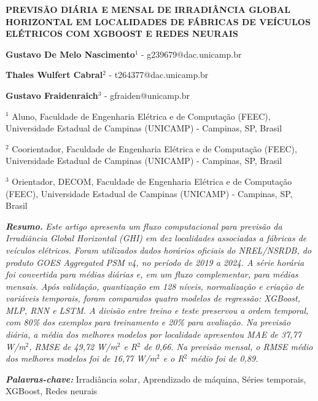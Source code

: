 \documentclass[12pt,a4paper]{article}
\begin{document}
\begin{center}
\textbf{PREVISÃO DIÁRIA E MENSAL DE IRRADIÂNCIA GLOBAL HORIZONTAL EM LOCALIDADES DE FÁBRICAS DE VEÍCULOS ELÉTRICOS COM XGBOOST E REDES NEURAIS}
\end{center}

\vspace{12pt}

\noindent\textbf{Gustavo De Melo Nascimento}$^{1}$ - g239679@dac.unicamp.br

\noindent\textbf{Thales Wulfert Cabral}$^{2}$ - t264377@dac.unicamp.br

\noindent\textbf{Gustavo Fraidenraich}$^{3}$ - gfraiden@unicamp.br

\vspace{6pt}

\noindent$^{1}$ Aluno, Faculdade de Engenharia Elétrica e de Computação (FEEC), Universidade Estadual de Campinas (UNICAMP) - Campinas, SP, Brasil

\noindent$^{2}$ Coorientador, Faculdade de Engenharia Elétrica e de Computação (FEEC), Universidade Estadual de Campinas (UNICAMP) - Campinas, SP, Brasil

\noindent$^{3}$ Orientador, DECOM, Faculdade de Engenharia Elétrica e de Computação (FEEC), Universidade Estadual de Campinas (UNICAMP) - Campinas, SP, Brasil

\vspace{24pt}

\noindent\textbf{\textit{Resumo.}} \textit{Este artigo apresenta um fluxo computacional para previsão da Irradiância Global Horizontal (GHI) em dez localidades associadas a fábricas de veículos elétricos. Foram utilizados dados horários oficiais do NREL/NSRDB, do produto GOES Aggregated PSM v4, no período de 2019 a 2024. A série horária foi convertida para médias diárias e, em um fluxo complementar, para médias mensais. Após validação, quantização em 128 níveis, normalização e criação de variáveis temporais, foram comparados quatro modelos de regressão: XGBoost, MLP, RNN e LSTM. A divisão entre treino e teste preservou a ordem temporal, com 80\% dos exemplos para treinamento e 20\% para avaliação. Na previsão diária, a média dos melhores modelos por localidade apresentou MAE de 37,77 W/m$^2$, RMSE de 49,72 W/m$^2$ e R$^2$ de 0,66. Na previsão mensal, o RMSE médio dos melhores modelos foi de 16,77 W/m$^2$ e o R$^2$ médio foi de 0,89.}

\vspace{12pt}

\noindent\textbf{\textit{Palavras-chave:}} Irradiância solar, Aprendizado de máquina, Séries temporais, XGBoost, Redes neurais
\end{document}
